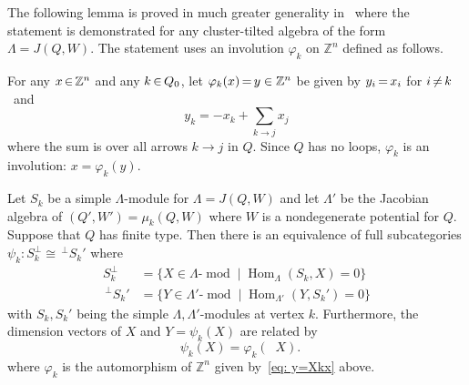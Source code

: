 \documentclass[ALCO,ThmDefs,Unicode,epreuves]{cedram}
\DeclareMathOperator{\Hom}{Hom}%
\DeclareMathOperator{\undim}{\underline{dim}}
\DeclareMathOperator{\modr}{mod}
\newcommand{\field}[1]{\mathbb{#1}}
\newcommand{\ZZ}{\ensuremath{{\field{Z}}}}
\newcommand*{\Mk}{\mkern -2mu}
\begin{document}


The following lemma is proved in much greater generality in~\cite[Sec~7]{BIRSm} where the statement is demonstrated for any cluster-tilted algebra of the form $\Lambda=J(Q,W)$. The statement uses an involution $\varphi_k$ on $\ZZ^n$ defined as follows.

For any $x \Mk \in \Mk \ZZ^n$ and any $k\Mk \in \Mk Q_0$, let $\varphi_k(x)\Mk =\Mk y\in \ZZ^n$ be given by $y_i\Mk =\Mk x_i$ for $i\Mk \neq \Mk k$~and
\begin{equation}\label{eq: y=Xkx}
	y_k=-x_k+\sum_{k\to j} x_j
\end{equation}
where the sum is over all arrows $k\to j$ in $Q$.
Since $Q$ has no loops, $\varphi_k$ is an involution: $x=\varphi_k(y)$.


\begin{lemm}\label{lem: inductive step A=B for Q finite type}
Let $S_k$ be a simple $\Lambda$-module for $\Lambda=J(Q,W)$ and let $\Lambda'$ be the Jacobian algebra of $(Q',W')=\mu_k(Q,W)$ where $W$ is a nondegenerate potential for $Q$. Suppose that $Q$ has finite type. Then there is an equivalence of full subcategories $\psi_k:S_k^\perp\cong \,^{\perp}S_k'$ where
\[
\begin{aligned}
	S_k^\perp&=\{X\in \Lambda\text{-}\modr \mid %
	\Hom_\Lambda(S_k,X)=0\}
\\
	\,^{\perp}S_k'&=\{Y\in \Lambda'\text{-}\modr\mid \Hom_{\Lambda'}(Y,S_k')=0\}
\end{aligned}
\]
with $S_k,S_k'$ being the simple $\Lambda,\Lambda'$-modules at vertex $k$. Furthermore, the dimension vectors of $X$ and $Y=\psi_k(X)$ are related by
\[
	\undim \psi_k(X)=\varphi_k(\undim X).
\]
where $\varphi_k$ is the automorphism of $\ZZ^n$ given by~\eqref{eq: y=Xkx} above.
\end{lemm}
\end{document}
